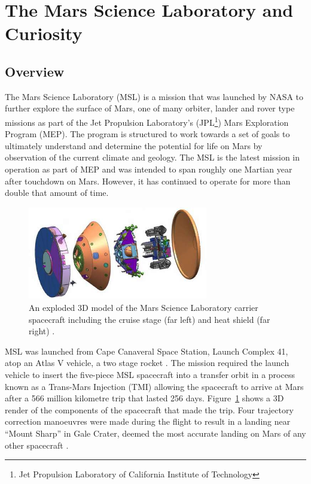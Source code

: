   \section{The Mars Science Laboratory and \textbf{Curiosity}}
    \subsection{Overview}
      The Mars Science Laboratory (MSL) is a mission that was launched by NASA to further explore the surface of Mars, one of many orbiter, lander and rover type missions as part of the Jet Propulsion Laboratory's (JPL\footnote{Jet Propulsion Laboratory of California Institute of Technology}) Mars Exploration Program (MEP). The program is structured to work towards a set of goals to ultimately understand and determine the potential for life on Mars \cite{meptheme} by observation of the current climate and geology. The MSL is the latest mission in operation as part of MEP and was intended to span roughly one Martian year after touchdown on Mars. However, it has continued to operate for more than double that amount of time. 
      
      \begin{figure}[ht]
        \centering
        \includegraphics[width=0.7\textwidth]{figures/mslSpacecraftExplodedView.jpg}
        \caption[An exploded 3D model of the Mars Science Laboratory carrier spacecraft including the cruise stage (far left) and heat shield (far right).]{An exploded 3D model of the Mars Science Laboratory carrier spacecraft including the cruise stage (far left) and heat shield (far right) \cite{fig:mslSpacecraftExplodedView_cite}.}
        \label{fig:mslSpacecraftExplodedView}
      \end{figure}
      
      
      MSL was launched from Cape Canaveral Space Station, Launch Complex 41, atop an Atlas V vehicle, a two stage rocket \cite{harwood2014sfn}. The mission required the launch vehicle to insert the five-piece MSL spacecraft into a transfer orbit in a process known as a Trans-Mars Injection (TMI) allowing the spacecraft to arrive at Mars after a 566 million kilometre trip that lasted 256 days. Figure~\ref{fig:mslSpacecraftExplodedView} shows a 3D render of the components of the spacecraft that made the trip. Four trajectory correction manoeuvres were made during the flight to result in a landing near ``Mount Sharp'' in Gale Crater, deemed the most accurate landing on Mars of any other spacecraft \cite{martinmur}.
      
